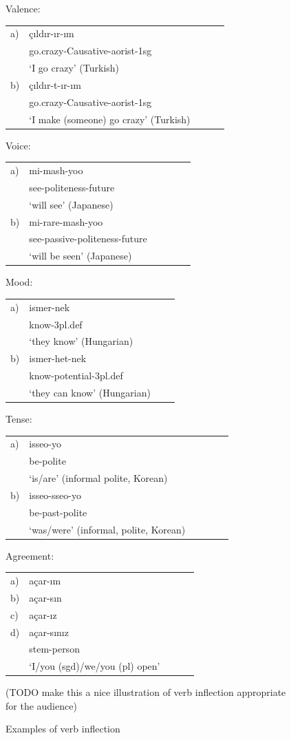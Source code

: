 \documentclass[11pt,letterpaper]{article}
\newcommand\mhahn[1]{{\color{red}(#1)}}
\newcounter{def}
\begin{document}
 \begin{figure}
     Valence:
\begin{tabular}{lllll}
	a) & {\c c}{\i}ld{\i}r-{\i}r-{\i}m \\
& go.crazy-Causative-aorist-1sg \\
& `I go crazy' (Turkish)\\
b) & {\c c}{\i}ld{\i}r-t-{\i}r-{\i}m \\
& go.crazy-Causative-aorist-1sg \\
& `I make (someone) go crazy' (Turkish) \\
\end{tabular}     
Voice:
\begin{tabular}{llllll}
a) & mi-mash-yoo \\
& see-politeness-future \\
& `will see' (Japanese) \\
b) & mi-rare-mash-yoo \\
& see-passive-politeness-future \\
&`will be seen' (Japanese)
\end{tabular}

Mood:
\begin{tabular}{llll}
a) & ismer-nek \\
& know-3pl.def \\
& `they know' (Hungarian) \\
b) & ismer-het-nek \\
& know-potential-3pl.def \\
& `they can know' (Hungarian)
\end{tabular}
Tense:
\begin{tabular}{llllll}
a) & isseo-yo \\ 
& be-polite \\
& `is/are' (informal polite, Korean) \\ 
b) & isseo-sseo-yo \\
 & be-past-polite \\
 & `was/were' (informal, polite, Korean)
 \end{tabular}
 Agreement:
\begin{tabular}{lllll}
a) & a{\c c}ar-{\i}m \\
b)& a{\c c}ar-s{\i}n \\
c) & a{\c c}ar-{\i}z \\
d) &a{\c c}ar-s{\i}n{\i}z \\
& stem-person \\
& `I/you (sgd)/we/you (pl) open'
\end{tabular}

\mhahn{TODO make this a nice illustration of verb inflection appropriate for the audience}
\caption{Examples of verb inflection}\label{tab:examples-verbs}
\end{figure}
 
\end{document}

